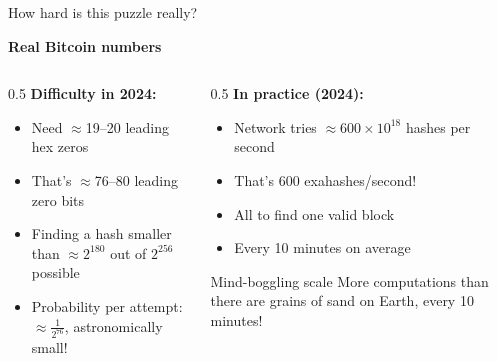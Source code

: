 \ifdefined\PRESENTATION\else\PassOptionsToClass{handout}{beamer}\fi\documentclass[aspectratio=169, lualatex]{beamer}
\begin{document}
\begin{frame}{How hard is this puzzle really?}
	\begin{center}
		\textbf{Real Bitcoin numbers}
	\end{center}
	\begin{columns}[c]
		\begin{column}{0.5\textwidth}
			\textbf{Difficulty in 2024:}
			\begin{itemize}
				\item Need $\approx$19--20 leading hex zeros
				\item That's $\approx$76--80 leading zero bits
				\item Finding a hash smaller than $\approx 2^{180}$ out of $2^{256}$ possible
				\item Probability per attempt: $\approx \frac{1}{2^{76}}$, astronomically small!
			\end{itemize}
		\end{column}
		\begin{column}{0.5\textwidth}
			\textbf{In practice (2024):}
			\begin{itemize}
				\item Network tries $\approx 600 \times 10^{18}$ hashes per second
				\item That's 600 exahashes/second!
				\item All to find one valid block
				\item Every 10 minutes on average
			\end{itemize}
			\begin{alertblock}{Mind-boggling scale}
				More computations than there are grains of sand on Earth, every 10 minutes!
			\end{alertblock}
		\end{column}
	\end{columns}
\end{frame}
\end{document}
